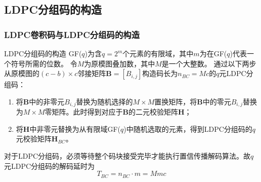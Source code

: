 \documentclass{beamer}
\begin{document}
\subsection{LDPC分组码的构造}
\begin{frame}[shrink]
    \frametitle{LDPC卷积码与LDPC分组码的构造}
        \begin{block}{LDPC分组码的构造}
GF($q$)为含$q=2^m$个元素的有限域，其中$m$为在GF($q$)代表一个符号所需的位数。
令$M$为原模图叠加数，其中$M$是一个大整数。
通过以下两步从原模图的$(c-b)\times c$邻接矩阵$\mathbf{B}=[B_{i,j}]$构造码长为$n_{BC}=Mc$的$q$元LDPC分组码：
\begin{enumerate}
\item 将$\mathbf{B}$中的非零元$B_{i,j}$替换为随机选择的$M \times M$置换矩阵，将$\mathbf{B}$中的零元$B_{i,j}$替换为$M \times M$零矩阵。此时得到对应于$\mathbf{B}$的二元校验矩阵$\mathbf{H}$；
\item 将$\mathbf{H}$中非零元替换为从有限域GF($q$)中随机选取的元素，得到LDPC分组码的$q$元校验矩阵$\mathbf{H}_{BC}$。
\end{enumerate}
对于LDPC分组码，必须等待整个码块接受完毕才能执行置信传播解码算法。故$q$元LDPC分组码的解码延时为
\begin{equation*}
T_{BC}=n_{BC}\cdot m = Mmc
\end{equation*}
        \end{block}
\end{frame}
\end{document}
